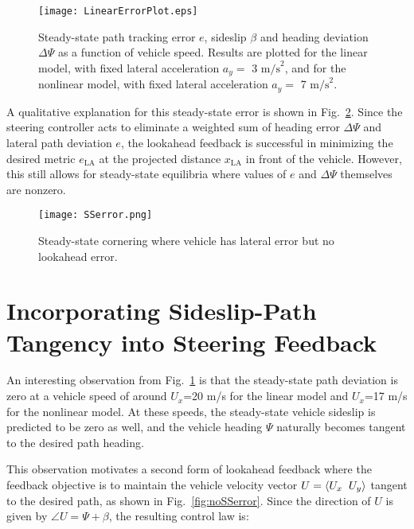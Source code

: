 \begin{figure}[h]
\centering
\texttt{[image: LinearErrorPlot.eps]}
\caption[Steady-state path tracking error $e$, sideslip $\beta$ and heading deviation $\Delta\Psi$ as a function of vehicle speed.]{Steady-state path tracking error $e$, sideslip $\beta$ and heading deviation $\Delta\Psi$ as a function of vehicle speed. Results are plotted for the linear model, with fixed lateral acceleration $a_y = $ 3 $\mathrm{m/s}^2$, and for the
nonlinear model, with fixed lateral acceleration $a_y = $ 7 $\mathrm{m/s}^2$.}
\label{fig:linError}
\end{figure}
 
A qualitative explanation for this steady-state error is shown in Fig.~\ref{fig:SSerror}. Since the steering controller acts to eliminate a weighted
sum of heading error $\Delta\Psi$ and lateral path deviation $e$, the lookahead feedback is successful in
minimizing the desired metric $e_\mathrm{LA}$ at the projected distance $x_\mathrm{LA}$ in front of the vehicle. However, this still allows for steady-state equilibria where
values of $e$ and $\Delta\Psi$ themselves are nonzero.  

\begin{figure}[h]
\centering
\texttt{[image: SSerror.png]}
\caption{Steady-state cornering where vehicle has lateral error but no lookahead error.}
\label{fig:SSerror}
\end{figure}
 

\section{Incorporating Sideslip-Path Tangency into \newline Steering Feedback}
\label{sec:betafb}

An interesting observation from Fig.~\ref{fig:linError} is that the steady-state path deviation
 is zero at a vehicle speed of around $U_x$=20 m/s for the linear model and $U_x$=17 m/s for the nonlinear model. 
 At these speeds, the steady-state vehicle sideslip is predicted to be zero as well, 
and the vehicle heading $\Psi$ naturally becomes tangent to the desired path heading. 

This observation motivates a second form of lookahead feedback where the feedback objective is to maintain the 
vehicle velocity vector $U = \langle U_x \hspace{2mm} U_y \rangle$ tangent to the desired path, as shown in Fig.~\ref{fig:noSSerror}. Since
 the direction of $U$ is given by $\angle U = \Psi+\beta$, the resulting control law is:
 
